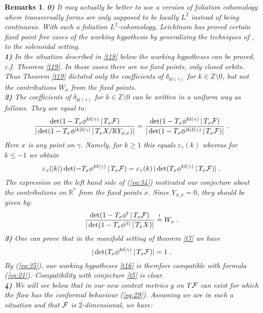 \documentclass[11pt,leqno]{article}
\newcommand{\R}{{\mathbb{R}}}
\newcommand{\Z}{{\mathbb{Z}}}
\newcommand{\Fh}{{\cal F}}
\newcommand{\ohne}{\setminus}
\newcommand{\tei}{\, | \,}
\newtheorem{remarks}[theorem]{Remarks}
\begin{document}
\begin{remarks} \label{t17}
  \rm {\bf 0)} It may actually be better to use a version of foliation cohomology where transversally forms are only supposed to be locally $L^2$ instead of being continuous. With such a foliation $L^2$-cohomology, Leichtnam \cite{Lei} has proved certain fixed point free cases of the working hypothesis by generalizing the techniques of \cite{AK1}, \cite{AK2} to the solenoidal setting.\\
{\bf 1)} In the situation described in \ref{t18} below the working hypotheses can be proved, c.f. Theorem \ref{t19}. In those cases there are no fixed points, only closed orbits. Thus Theorem \ref{t19} dictated only the coefficients of $\delta_{kl (\gamma)}$ for $k \in \Z \ohne 0$, but not the contributions $W_x$ from the fixed points. \\
{\bf 2)} The coefficients of $\delta_{kl (\gamma)}$ for $k \in \Z \ohne 0$ can be written in a uniform way as follows. They are equal to:
\begin{equation}
  \label{eq:34}
  \frac{\det (1 - T_x \phi^{kl (\gamma)} \tei T_x \Fh)}{|\det (1 - T_x \phi^{|k| l (\gamma)} \tei T_x X / \R  Y_{\phi , x})|} = \frac{\det (1 - T_x \phi^{kl (\gamma)} \tei T_x \Fh)}{| \det (1 - T_x \phi^{|k| l (\gamma)} \tei T_x \Fh)|} \; .
\end{equation}
Here $x$ is any point on $\gamma$. Namely, for $k \ge 1$ this equals $\varepsilon_{\gamma} (k)$ whereas for $k \le -1$ we obtain
\begin{equation}
  \label{eq:35}
  \varepsilon_{\gamma} (|k|) \det (- T_x \phi^{kl (\gamma)} \tei T_x \Fh) = \varepsilon_{\gamma} (k) \, |\det (T_x \phi^{kl (\gamma)} \tei T_x \Fh)| \; .
\end{equation}
The expression on the left hand side of (\ref{eq:34}) motivated our conjecture about the contributions on $\R^*$ from the fixed points $x$. Since $Y_{\phi , x} = 0$, they should be given by:
\[
\frac{\det (1 - T_x \phi^t \tei T_x \Fh)}{| \det (1 - T_x \phi^{|t|} \tei T_x X)|} \overset{!}{=} W_x \; .
\]
{\bf 3)} One can prove that in the manifold setting of theorem \ref{t7} we have
\[
|\det (T_x \phi^{kl (\gamma)} \tei T_x \Fh)| = 1 \; .
\]
By (\ref{eq:35}), our working hypotheses \ref{t16} is therefore compatible with formula (\ref{eq:21}). Compatibility with conjecture \ref{t5} is clear.\\
{\bf 4)} We will see below that in our new context metrics $g$ on $T\Fh$ can exist for which the flow has the conformal behaviour (\ref{eq:29}). Assuming we are in such a situation and that $\Fh$ is $2$-dimensional, we have:

\end{remarks}
\end{document}
